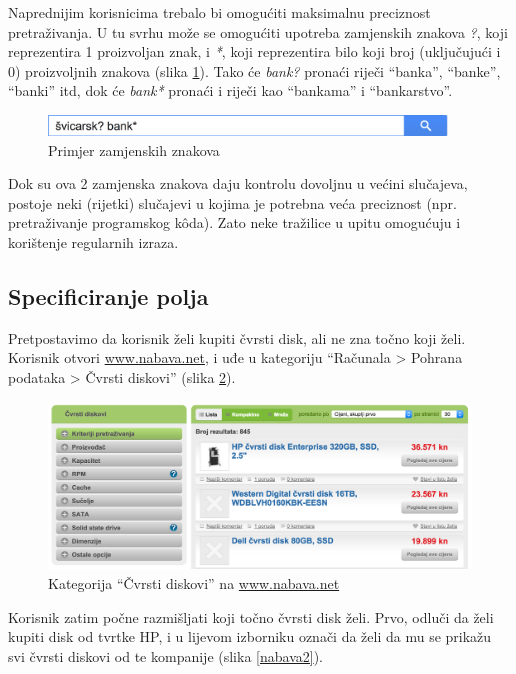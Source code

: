 \documentclass[a4paper,twoside,12pt]{scrreprt}
\begin{document}
Naprednijim korisnicima trebalo bi omogućiti maksimalnu preciznost pretraživanja. U tu svrhu može se omogućiti upotreba zamjenskih znakova \textit{?}, koji reprezentira 1 proizvoljan znak, i \textit{*}, koji reprezentira bilo koji broj (uključujući i 0) proizvoljnih znakova (slika \ref{wildcards}). Tako će \textit{bank?} pronaći riječi ``banka'', ``banke'', ``banki'' itd, dok će \textit{bank*} pronaći i riječi kao ``bankama'' i ``bankarstvo''.

\begin{figure}[H]
  \centering
  \includegraphics[width=300pt]{wildcards}
  \caption{Primjer zamjenskih znakova}
  \label{wildcards}
\end{figure}

Dok su ova 2 zamjenska znakova daju kontrolu dovoljnu u većini slučajeva, postoje neki (rijetki) slučajevi u kojima je potrebna veća preciznost (npr. pretraživanje programskog kôda). Zato neke tražilice u upitu omogućuju i korištenje regularnih izraza.

\subsection{Specificiranje polja}

Pretpostavimo da korisnik želi kupiti čvrsti disk, ali ne zna točno koji želi. Korisnik otvori \url{www.nabava.net}, i uđe u kategoriju ``Računala > Pohrana podataka > Čvrsti diskovi'' (slika \ref{nabava1}).

\begin{figure}[H]
  \centering
  \includegraphics[width=\textwidth]{nabava1}
  \caption{Kategorija ``Čvrsti diskovi'' na \url{www.nabava.net}}
  \label{nabava1}
\end{figure}

Korisnik zatim počne razmišljati koji točno čvrsti disk želi. Prvo, odluči da želi kupiti disk od tvrtke HP, i u lijevom izborniku označi da želi da mu se prikažu svi čvrsti diskovi od te kompanije (slika \ref{nabava2}).
\end{document}
